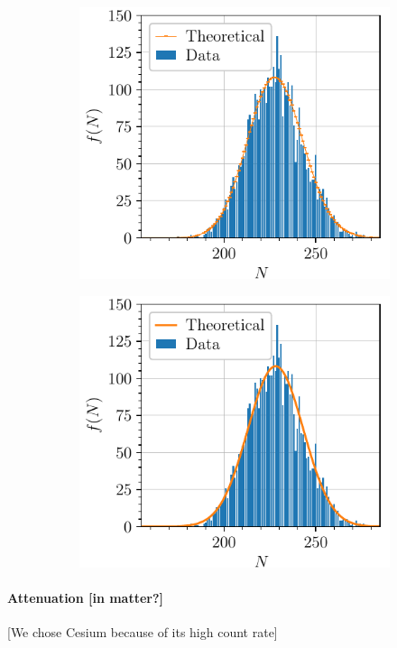 \begin{figure}[htbp]
\begin{subfigure}{0.495\textwidth}
        \includegraphics[scale=1]{figures/highmean_poisson.pdf}
    \end{subfigure}
    \hfill
    \begin{subfigure}{0.495\textwidth}
        \includegraphics[scale=1]{figures/highmean_gaussian.pdf}
    \end{subfigure}
\end{figure}

\paragraph{Attenuation [in matter?]}
[We chose Cesium because of its high count rate]


